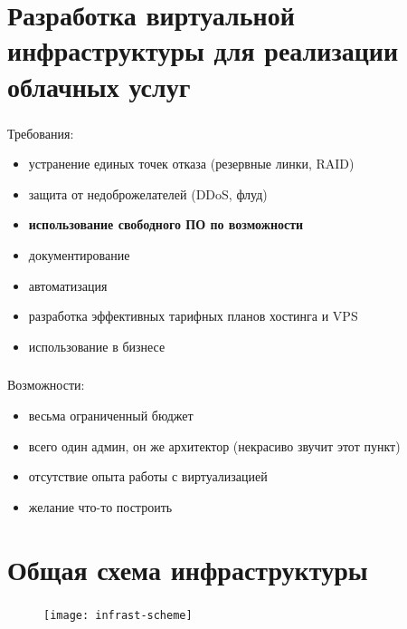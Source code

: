 
\frame[plain]{\titlepage} %


\section{Разработка виртуальной инфраструктуры для реализации облачных услуг}

\begin{frame}
\frametitle{\insertsection}
Требования:
\begin{itemize}
	\item устранение единых точек отказа (резервные линки, RAID)
	\item защита от недоброжелателей (DDoS, флуд)
	\item \textbf{использование свободного ПО по возможности}
	\item документирование
	\item автоматизация
	\item разработка эффективных тарифных планов хостинга и VPS
	\item использование в бизнесе
\end{itemize}
\end{frame}

\begin{frame}
\frametitle{\insertsection}
Возможности:
\begin{itemize}
	\item весьма ограниченный бюджет
	\item всего один админ, он же архитектор (некрасиво звучит этот пункт)
	\item отсутствие опыта работы с виртуализацией
	\item желание что-то построить
\end{itemize}
\end{frame}


\section{Общая схема инфраструктуры}

\begin{frame}
\frametitle{\insertsection}
\begin{figure}[h]
	\begin{center}
		\texttt{[image: infrast-scheme]}
	 \end{center}
\end{figure}
\end{frame}

